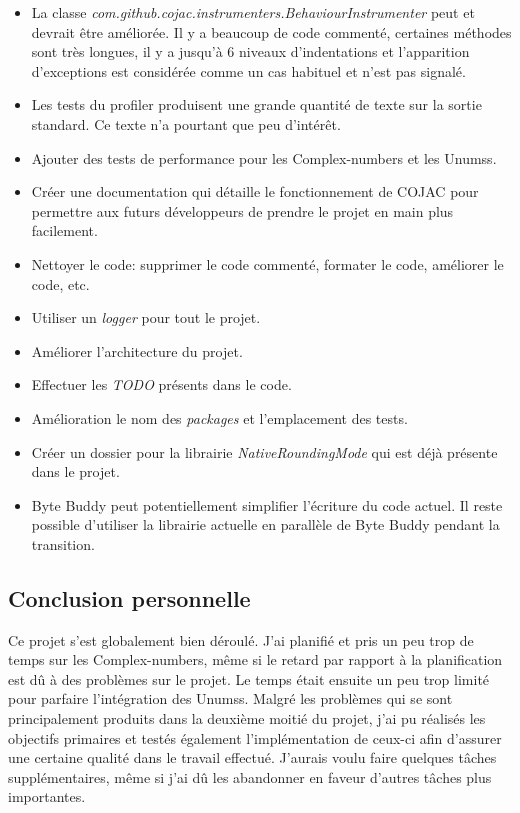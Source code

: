 \begin{itemize}
    \item La classe \textit{com.github.cojac.instrumenters.BehaviourInstrumenter} peut et devrait être améliorée. Il y a beaucoup de code commenté, certaines méthodes sont très longues, il y a jusqu'à 6 niveaux d'indentations et l'apparition d'exceptions est considérée comme un cas habituel et n'est pas signalé.
    \item Les tests du profiler produisent une grande quantité de texte sur la sortie standard. Ce texte n'a pourtant que peu d'intérêt.
    \item Ajouter des tests de performance pour les \glspl{Complex-number} et les \glspl{Unums}.
    \item Créer une documentation qui détaille le fonctionnement de \gls{COJAC} pour permettre aux futurs développeurs de prendre le projet en main plus facilement.
    \item Nettoyer le code: supprimer le code commenté, formater le code, améliorer le code, etc.
    \item Utiliser un \textit{logger} pour tout le projet.
    \item Améliorer l'architecture du projet.
    \item Effectuer les \textit{TODO} présents dans le code.
    \item Amélioration le nom des \textit{packages} et l'emplacement des tests.
    \item Créer un dossier pour la librairie \textit{NativeRoundingMode} qui est déjà présente dans le projet.
    \item Byte Buddy \cite{byte-buddy} peut potentiellement simplifier l'écriture du code actuel. Il reste possible d'utiliser la librairie actuelle en parallèle de Byte Buddy pendant la transition.
\end{itemize}

\subsection{Conclusion personnelle}

Ce projet s'est globalement bien déroulé. J'ai planifié et pris un peu trop de temps sur les \glspl{Complex-number}, même si le retard par rapport à la planification est dû à des problèmes sur le projet. Le temps était ensuite un peu trop limité pour parfaire l'intégration des \glspl{Unums}. Malgré les problèmes qui se sont principalement produits dans la deuxième moitié du projet, j'ai pu réalisés les objectifs primaires et testés également l'implémentation de ceux-ci afin d'assurer une certaine qualité dans le travail effectué. J'aurais voulu faire quelques tâches supplémentaires, même si j'ai dû les abandonner en faveur d'autres tâches plus importantes.

